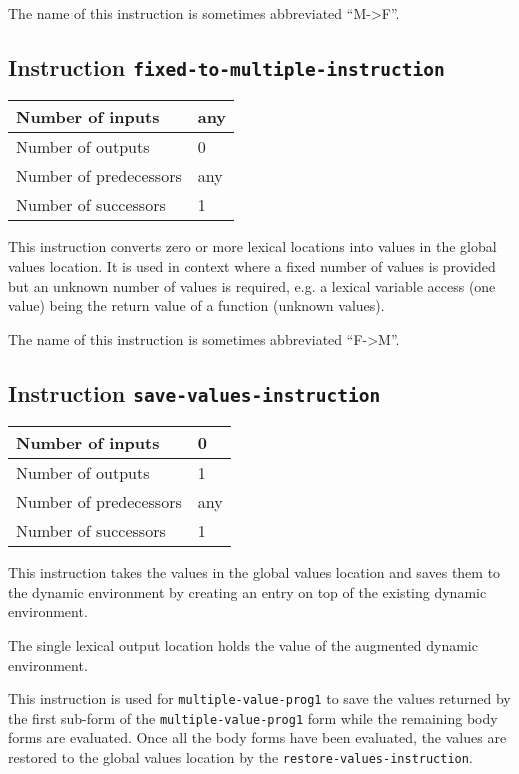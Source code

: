 The name of this instruction is sometimes abbreviated ``M->F''.

\subsection{Instruction \texttt{fixed-to-multiple-instruction}}
\label{hir-instruction-fixed-to-multiple}

\begin{tabular}{|l|l|}
  \hline
  Number of inputs & any\\
  \hline
  Number of outputs & 0\\
  \hline
  Number of predecessors & any\\
  \hline
  Number of successors & 1\\
  \hline
\end{tabular}

This instruction converts zero or more lexical locations into values
in the global values location. It is used in context where a fixed
number of values is provided but an unknown number of values is
required, e.g. a lexical variable access (one value) being the return
value of a function (unknown values).

The name of this instruction is sometimes abbreviated ``F->M''.

\subsection{Instruction \texttt{save-values-instruction}}
\label{hir-instruction-save-values}

\begin{tabular}{|l|l|}
  \hline
  Number of inputs & 0\\
  \hline
  Number of outputs & 1\\
  \hline
  Number of predecessors & any\\
  \hline
  Number of successors & 1\\
  \hline
\end{tabular}

This instruction takes the values in the global values location and
saves them to the dynamic environment by creating an entry on top of
the existing dynamic environment.

The single lexical output location holds the value of the augmented
dynamic environment.

This instruction is used for \texttt{multiple-value-prog1} to save the
values returned by the first sub-form of the
\texttt{multiple-value-prog1} form while the remaining body forms are
evaluated.  Once all the body forms have been evaluated, the values
are restored to the global values location by the
\texttt{restore-values-instruction}.

